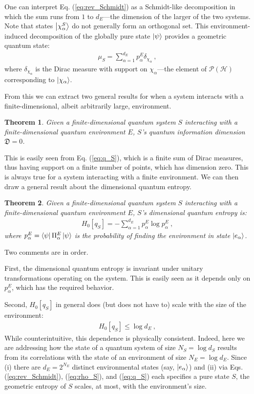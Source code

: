 \documentclass[draft,nofootinbib,pre,twocolumn,showkeys,superscriptaddress,preprintnumbers,floatfix]{revtex4-1}
\newtheorem{theorem}{Theorem}
\newcommand{\1}{\mathbbm{1}}
\newcommand{\PH}{\mathcal{P}(\mathcal{H})}
\newcommand{\DD}{\mathfrak{D}}
\begin{document}
One can interpret Eq. (\ref{eq:rev_Schmidt}) as a Schmidt-like decomposition in
which the sum runs from $1$ to $d_E$---the dimension of the larger of the two
systems. Note that states $\ket{\chi_\alpha^S}$ do not generally form an
orthogonal set. This environment-induced decomposition of the globally pure
state $\ket{\psi}$ provides a geometric quantum state:
\begin{align}
\mu_S = \sum_{\alpha=1}^{d_E} p_\alpha^E \delta_{{\chi_\alpha}}
  ~,
\label{eq:q_S}
\end{align}
where $\delta_{\chi_\alpha}$ is the Dirac measure with support on
$\chi_\alpha$---the element of $\PH$ corresponding to $\ket{\chi_\alpha}$.

From this we can extract two general results for when a system interacts with
a finite-dimensional, albeit arbitrarily large, environment.

\begin{theorem}
Given a finite-dimensional quantum system $S$ interacting with a
finite-dimensional quantum environment $E$, $S$'s quantum information dimension
$\DD=0$.
\label{theo:2}
\end{theorem}

This is easily seen from Eq. (\ref{eq:q_S}), which is a finite sum of Dirac
measures, thus having support on a finite number of points, which has dimension
zero. This is always true for a system interacting with a finite environment.
We can then draw a general result about the dimensional quantum entropy.

\begin{theorem}\label{theo:3}
Given a finite-dimensional quantum system $S$ interacting with a
finite-dimensional quantum environment $E$, $S$'s dimensional quantum entropy is: 
\begin{align*}
H_{0}\left[ q_S\right] = - \sum_{\alpha=1}^{d_E} p_\alpha^E \log p_\alpha^E
  ~,
\end{align*}
where $p_\alpha^E = \bra{\psi} \Pi^E_\alpha \ket{\psi}$ is the probability of
finding the environment in state $\ket{e_\alpha}$.
\end{theorem}

Two comments are in order.

First, the dimensional quantum entropy is invariant under unitary
transformations operating on the system. This is easily seen as it depends only
on $p_\alpha^E$, which has the required behavior.

Second, $H_{0}\left[ q_S\right]$ in general does (but does not have to) scale with the size 
of the environment:
\begin{align*}
H_{0}\left[ q_S\right] \leq \log d_E
  ~,
\end{align*}
While counterintuitive, this dependence is physically consistent. Indeed, here
we are addressing how the state of a quantum system of size $N_S = \log d_S$
results from its correlations with the state of an environment of size $N_E =
\log d_E$. Since (i) there are $d_E = 2^{N_E}$ distinct environmental states
(say, $\ket{e_\alpha}$) and (ii) via Eqs. (\ref{eq:rev_Schmidt}),
(\ref{eq:rho_S}), and (\ref{eq:q_S}) each specifies a pure state $S$, the
geometric entropy of $S$ scales, at most, with the environment's size.
\end{document}
